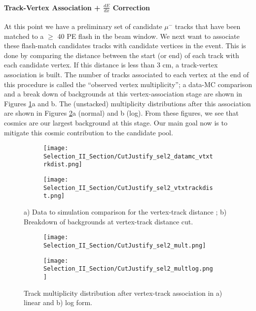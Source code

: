 \paragraph{Track-Vertex Association + $\frac{dE}{dx}$ Correction}
At this point we have a preliminary set of candidate $\mu^-$ tracks that have been matched to a $\geq$ 40 PE flash in the beam window. We next want to associate these flash-match candidates tracks with candidate vertices in the event. This is done by comparing the distance between the start (or end) of each track with each candidate vertex. If this distance is less than 3 cm, a track-vertex association is built.  The number of tracks associated to each vertex at the end of this procedure is called the ``observed vertex multiplicity''; a data-MC comparison and a break down of backgrounds at this vertex-association stage are shown in Figures \ref{fig:cutjust_sel2_vtxtrackdist}a and b.  The (unstacked) multiplicity distributions after this association are shown in Figures \ref{fig:cutjust_sel2_mult}a (normal) and b (log). From these figures, we see that cosmics are our largest background at this stage. Our main goal now is to mitigate this cosmic contribution to the candidate pool.
\begin{figure}[h!]
\centering
  \begin{subfigure}[t]{0.4\textwidth}
    \centering
\texttt{[image: Selection\_II\_Section/CutJustify\_sel2\_datamc\_vtxtrkdist.png]}
    \caption{ }
  \end{subfigure} 
  \hspace{10 mm}
  \begin{subfigure}[t]{0.4\textwidth}
    \centering
\texttt{[image: Selection\_II\_Section/CutJustify\_sel2\_vtxtrackdist.png]}
    \caption{ }
  \end{subfigure} 
\caption{ a) Data to simulation comparison for the vertex-track distance ; b) Breakdown of backgrounds at vertex-track distance cut. }
\label{fig:cutjust_sel2_vtxtrackdist}
\end{figure}

\begin{figure}[h!]
\centering
  \begin{subfigure}[t]{0.4\textwidth}
    \centering
\texttt{[image: Selection\_II\_Section/CutJustify\_sel2\_mult.png]}
    \caption{ }
  \end{subfigure} 
  \hspace{10 mm}
  \begin{subfigure}[t]{0.4\textwidth}
    \centering
\texttt{[image: Selection\_II\_Section/CutJustify\_sel2\_multlog.png]}
    \caption{ }
  \end{subfigure} 
\caption{ Track multiplicity distribution after vertex-track association in a) linear and b) log form. }
\label{fig:cutjust_sel2_mult}
\end{figure}

